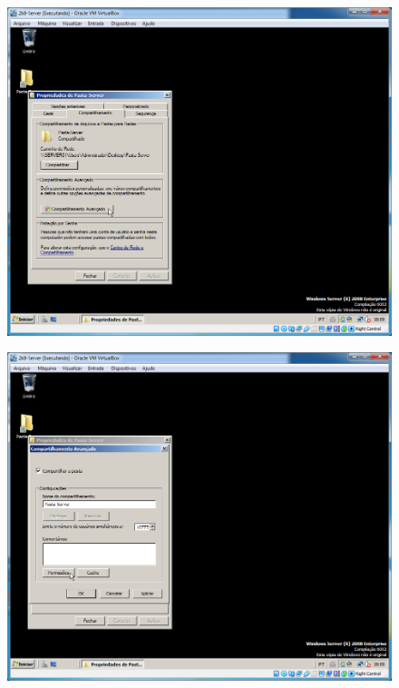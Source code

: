 \documentclass[10pt]{article}
\begin{document}
\begin{figure}[H]
    \centering
    \caption{}
    \label{fig:5119}
    \includegraphics[width=\linewidth]{images/windows_server/compartilhamento/011.png}
\end{figure}
\begin{figure}[H]
    \centering
    \caption{}
    \label{fig:51110}
    \includegraphics[width=\linewidth]{images/windows_server/compartilhamento/013.png}
\end{figure}
\end{document}
